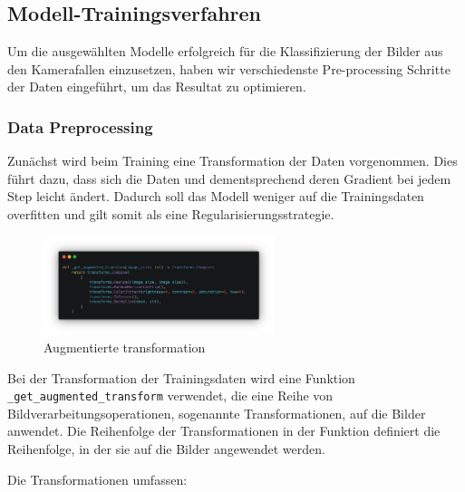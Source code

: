 \documentclass{article}
\begin{document}
\newpage

\subsection{Modell-Trainingsverfahren}

Um die ausgewählten Modelle erfolgreich für die Klassifizierung der Bilder aus den Kamerafallen einzusetzen, haben wir verschiedenste Pre-processing Schritte der Daten eingeführt, um das Resultat zu optimieren. 

\subsubsection{Data Preprocessing}
Zunächst wird beim Training eine Transformation der Daten vorgenommen. Dies führt dazu, dass sich die Daten und dementsprechend deren Gradient bei jedem Step leicht ändert. Dadurch soll das Modell weniger auf die Trainingsdaten overfitten und gilt somit als eine Regularisierungsstrategie.

\begin{figure}[!h]
    \centering
    \includegraphics[width=0.6\textwidth]{images/augmented_transformation.png}
    \caption{\label{fig:augmented_transformation}Augmentierte transformation}
\end{figure}

Bei der Transformation der Trainingsdaten wird eine Funktion \texttt{\_get\_augmented\_transform} verwendet, die eine Reihe von Bildverarbeitungsoperationen, sogenannte Transformationen, auf die Bilder anwendet. Die Reihenfolge der Transformationen in der Funktion definiert die Reihenfolge, in der sie auf die Bilder angewendet werden.

\noindent
Die Transformationen umfassen:
\end{document}
